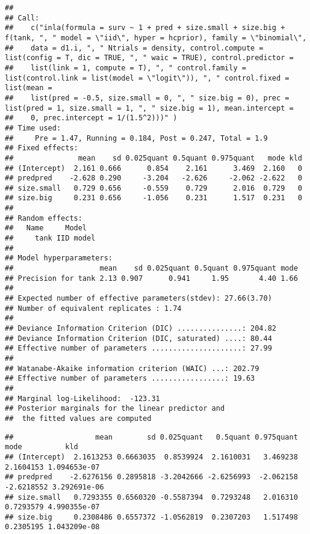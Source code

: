 \documentclass[
]{article}
\newenvironment{Shaded}{\begin{snugshade}}{\end{snugshade}}
\newcommand{\FloatTok}[1]{\textcolor[rgb]{0.00,0.00,0.81}{#1}}
\newcommand{\NormalTok}[1]{#1}
\newcommand{\OperatorTok}[1]{\textcolor[rgb]{0.81,0.36,0.00}{\textbf{#1}}}
\begin{document}
\begin{verbatim}
## 
## Call:
##    c("inla(formula = surv ~ 1 + pred + size.small + size.big + f(tank, ", " model = \"iid\", hyper = hcprior), family = \"binomial\", 
##    data = d1.i, ", " Ntrials = density, control.compute = list(config = T, dic = TRUE, ", " waic = TRUE), control.predictor = 
##    list(link = 1, compute = T), ", " control.family = list(control.link = list(model = \"logit\")), ", " control.fixed = list(mean = 
##    list(pred = -0.5, size.small = 0, ", " size.big = 0), prec = list(pred = 1, size.small = 1, ", " size.big = 1), mean.intercept = 
##    0, prec.intercept = 1/(1.5^2)))" ) 
## Time used:
##     Pre = 1.47, Running = 0.184, Post = 0.247, Total = 1.9 
## Fixed effects:
##               mean    sd 0.025quant 0.5quant 0.975quant   mode kld
## (Intercept)  2.161 0.666      0.854    2.161      3.469  2.160   0
## predpred    -2.628 0.290     -3.204   -2.626     -2.062 -2.622   0
## size.small   0.729 0.656     -0.559    0.729      2.016  0.729   0
## size.big     0.231 0.656     -1.056    0.231      1.517  0.231   0
## 
## Random effects:
##   Name     Model
##     tank IID model
## 
## Model hyperparameters:
##                    mean    sd 0.025quant 0.5quant 0.975quant mode
## Precision for tank 2.13 0.907      0.941     1.95       4.40 1.66
## 
## Expected number of effective parameters(stdev): 27.66(3.70)
## Number of equivalent replicates : 1.74 
## 
## Deviance Information Criterion (DIC) ...............: 204.82
## Deviance Information Criterion (DIC, saturated) ....: 80.44
## Effective number of parameters .....................: 27.99
## 
## Watanabe-Akaike information criterion (WAIC) ...: 202.79
## Effective number of parameters .................: 19.63
## 
## Marginal log-Likelihood:  -123.31 
## Posterior marginals for the linear predictor and
##  the fitted values are computed
\end{verbatim}

\begin{Shaded}
\end{Shaded}

\begin{verbatim}
##                   mean        sd 0.025quant   0.5quant 0.975quant       mode          kld
## (Intercept)  2.1613253 0.6663035  0.8539924  2.1610031   3.469238  2.1604153 1.094653e-07
## predpred    -2.6276156 0.2895818 -3.2042666 -2.6256993  -2.062158 -2.6218552 3.292691e-06
## size.small   0.7293355 0.6560320 -0.5587394  0.7293248   2.016310  0.7293579 4.990355e-07
## size.big     0.2308486 0.6557372 -1.0562819  0.2307203   1.517498  0.2305195 1.043209e-08
\end{verbatim}
\end{document}
